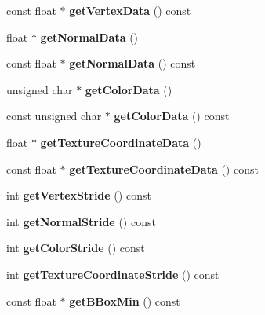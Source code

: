 \begin{DoxyCompactItemize}
const float $\ast$ {\bfseries get\+Vertex\+Data} () const
\item 
\mbox{\label{class_mesh_base_a3f54fa8530f04fb7ca5f65a5926d096d}} 
float $\ast$ {\bfseries get\+Normal\+Data} ()
\item 
\mbox{\label{class_mesh_base_a4889f21846770166952806dce1b6cb02}} 
const float $\ast$ {\bfseries get\+Normal\+Data} () const
\item 
\mbox{\label{class_mesh_base_a1d33890b0671efeab525e60dcd865f8d}} 
unsigned char $\ast$ {\bfseries get\+Color\+Data} ()
\item 
\mbox{\label{class_mesh_base_ab87576c8d231a10f25646c7ac928aabd}} 
const unsigned char $\ast$ {\bfseries get\+Color\+Data} () const
\item 
\mbox{\label{class_mesh_base_a0e7351cf40de55390a3738f84e65b4b0}} 
float $\ast$ {\bfseries get\+Texture\+Coordinate\+Data} ()
\item 
\mbox{\label{class_mesh_base_a08d10718a469776ce607ec81ba88b377}} 
const float $\ast$ {\bfseries get\+Texture\+Coordinate\+Data} () const
\item 
\mbox{\label{class_mesh_base_afaea93d4ed2236c7233cb6e19c26696c}} 
int {\bfseries get\+Vertex\+Stride} () const
\item 
\mbox{\label{class_mesh_base_a1ba9f0d3dde4a27c62c83f69282b60fb}} 
int {\bfseries get\+Normal\+Stride} () const
\item 
\mbox{\label{class_mesh_base_aac85eda0950200f6b82e1d519677c749}} 
int {\bfseries get\+Color\+Stride} () const
\item 
\mbox{\label{class_mesh_base_ab38712efa2b4a0644375409843109767}} 
int {\bfseries get\+Texture\+Coordinate\+Stride} () const
\item 
\mbox{\label{class_mesh_base_a3f462666ec028e4db6588218c6859614}} 
const float $\ast$ {\bfseries get\+B\+Box\+Min} () const
\item 

\end{DoxyCompactItemize}
